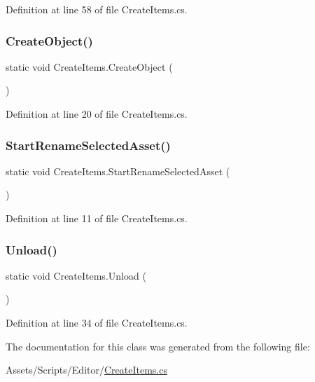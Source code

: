Definition at line 58 of file Create\+Items.\+cs.

\mbox{\label{class_create_items_ae50469b06b617df7a2ff54c9840aa3ed}} 
\subsubsection{\texorpdfstring{Create\+Object()}{CreateObject()}}
{\footnotesize\ttfamily static void Create\+Items.\+Create\+Object (\begin{DoxyParamCaption}{ }\end{DoxyParamCaption})\hspace{0.3cm}{\ttfamily [static]}}



Definition at line 20 of file Create\+Items.\+cs.

\mbox{\label{class_create_items_a35529e501074aba3e975b5916ebecfb0}} 
\subsubsection{\texorpdfstring{Start\+Rename\+Selected\+Asset()}{StartRenameSelectedAsset()}}
{\footnotesize\ttfamily static void Create\+Items.\+Start\+Rename\+Selected\+Asset (\begin{DoxyParamCaption}{ }\end{DoxyParamCaption})\hspace{0.3cm}{\ttfamily [static]}}



Definition at line 11 of file Create\+Items.\+cs.

\mbox{\label{class_create_items_a6284bdda80be5f13463fdb7c79880a70}} 
\subsubsection{\texorpdfstring{Unload()}{Unload()}}
{\footnotesize\ttfamily static void Create\+Items.\+Unload (\begin{DoxyParamCaption}{ }\end{DoxyParamCaption})\hspace{0.3cm}{\ttfamily [static]}}



Definition at line 34 of file Create\+Items.\+cs.



The documentation for this class was generated from the following file\+:\begin{DoxyCompactItemize}
\item 
Assets/\+Scripts/\+Editor/\mbox{\hyperlink{_create_items_8cs}{Create\+Items.\+cs}}\end{DoxyCompactItemize}
